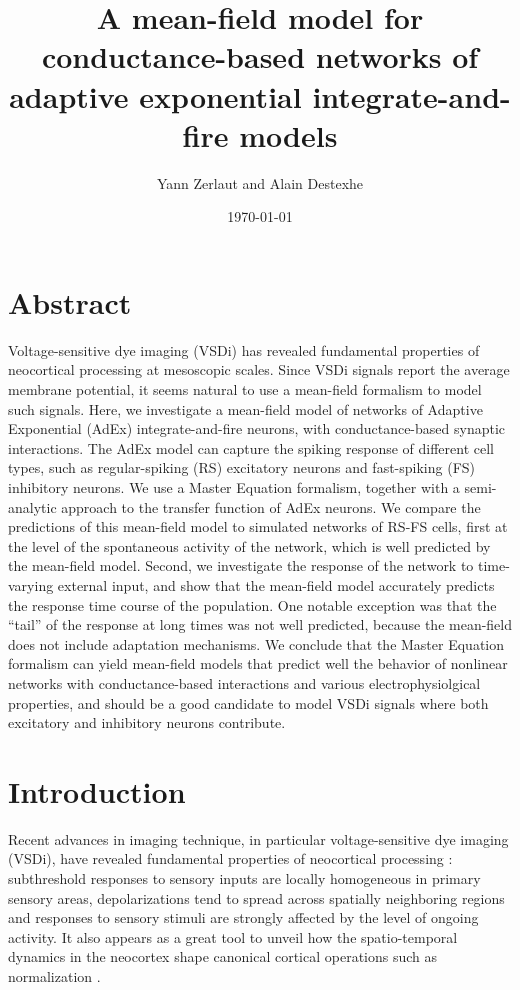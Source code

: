\documentclass[8pt, colorlinks, a4paper]{article}
\author{Yann Zerlaut and Alain Destexhe}
\date{\today}
\title{A mean-field model for conductance-based networks of adaptive
  exponential integrate-and-fire models}
\begin{document}
\maketitle

\linenumbers

\section{Abstract}
\label{sec-1}
\bfseries

Voltage-sensitive dye imaging (VSDi) has revealed fundamental
properties of neocortical processing at mesoscopic scales.  Since VSDi
signals report the average membrane potential, it seems natural to use
a mean-field formalism to model such signals.  Here, we investigate a
mean-field model of networks of Adaptive Exponential (AdEx)
integrate-and-fire neurons, with conductance-based synaptic
interactions.  The AdEx model can capture the spiking response of
different cell types, such as regular-spiking (RS) excitatory neurons
and fast-spiking (FS) inhibitory neurons.  We use a Master Equation
formalism, together with a semi-analytic approach to the transfer
function of AdEx neurons.  We compare the predictions of this
mean-field model to simulated networks of RS-FS cells, first at the
level of the spontaneous activity of the network, which is well
predicted by the mean-field model.  Second, we investigate the
response of the network to time-varying external input, and show that
the mean-field model accurately predicts the response time course of
the population.  One notable exception was that the ``tail'' of the
response at long times was not well predicted, because the mean-field
does not include adaptation mechanisms.  We conclude that the Master
Equation formalism can yield mean-field models that predict well the
behavior of nonlinear networks with conductance-based interactions and
various electrophysiolgical properties, and should be a good candidate
to model VSDi signals where both excitatory and inhibitory neurons
contribute.

\normalfont

\section{Introduction}
\label{sec-2}
\normalfont

Recent advances in imaging technique, in particular voltage-sensitive
dye imaging (VSDi), have revealed fundamental properties of
neocortical processing
\cite{Arieli1996,Contreras2001,Petersen2001,Ferezou2006,Civillico2012}:
subthreshold responses to sensory inputs are locally homogeneous in
primary sensory areas, depolarizations tend to spread across spatially
neighboring regions and responses to sensory stimuli are strongly
affected by the level of ongoing activity. It also appears as a great
tool to unveil how the spatio-temporal dynamics in the neocortex shape
canonical cortical operations such as normalization
\cite{Reynaud2012}.
\end{document}

